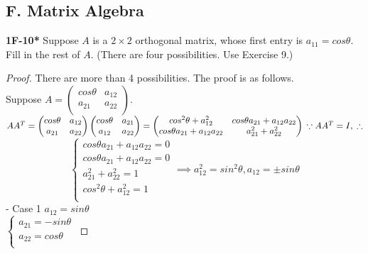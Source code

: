 \documentclass{article}
\begin{document}
\subsection{F. Matrix Algebra}
\textbf{1F-10*} Suppose $A$ is a $2 \times 2$ orthogonal matrix, whose first entry is $a_{11} = cos \theta$. Fill in the rest of $A$. (There are four possibilities. Use Exercise 9.)
\begin{proof}
There are more than 4 possibilities. The proof is as follows.
\\ Suppose
$A = 
\begin{pmatrix}
cos\theta & a_{12} \\
a_{21} & a_{22} \\
\end{pmatrix}$. \\
$AA^T = 
\begin{pmatrix}
cos\theta & a_{12} \\
a_{21} & a_{22} \\
\end{pmatrix}
\begin{pmatrix}
cos\theta & a_{21} \\
a_{12} & a_{22} \\
\end{pmatrix}
=
\begin{pmatrix}
cos^2\theta + a_{12}^2 & cos\theta a_{21} + a_{12}a_{22} \\
cos\theta a_{21} + a_{12}a_{22} & a_{21}^2 + a_{22}^2 \\
\end{pmatrix}
\\ \because AA^T = I, 
\\ \therefore$
\begin{equation}
 \begin{cases}
cos\theta a_{21} + a_{12} a_{22} = 0 \\
cos\theta a_{21} + a_{12} a_{22} = 0 \\
a_{21}^2 + a_{22}^2 = 1 \\
cos^2\theta + a_{12}^2 = 1 \\
\end{cases}
\implies
a_{12}^2 = sin^2\theta, a_{12} = \pm sin\theta
\end{equation}
- Case 1 $a_{12} = sin\theta$
\\ 
$
\begin{cases}
a_{21} = -sin\theta \\
a_{22} = cos\theta \\
\end{cases}
$

\end{proof}
\end{document}
